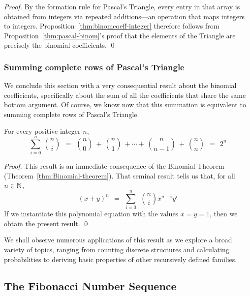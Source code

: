 \begin{proof}
By the formation rule for Pascal's Triangle, every entry in that array is obtained from integers via repeated additions---an operation that maps integers to integers. Proposition~\ref{thm:binomcoeff-integer} therefore follows from Proposition~\ref{thm:pascal-binom}'s proof that the elements of the Triangle are precisely the binomial coefficients.  \qed
\end{proof}


\subsubsection{Summing complete rows of Pascal's Triangle}
\label{sec:summaion-BinCoeff}

We conclude this section with a very consequential result about the binomial coefficients, specifically about the sum of all the coefficients that share the same bottom argument.  Of course, we know now that this summation is equivalent to summing complete rows of Pascal's Triangle.


\begin{prop}
\label{thm:sumsof-binomcoeff}
For every positive integer $n$,
\[
\sum_{i=0}^n \ {n \choose i} \ \ = \ \
{n \choose 0} \ + \ {n \choose 1} \ + \cdots + \ {n \choose {n-1}} \ + \ {n \choose n} \ \ = \ \ 2^n
\]
\end{prop}

\begin{proof}
This result is an immediate consequence of the Binomial Theorem 
(Theorem~\ref{thm:Binomial-theorem}).  That seminal result tells us that, for all $n \in \mathbb{N}$,
\[
(x+y)^n \ \ = \ \ \sum_{i=0}^n \ \ {n \choose i} x^{n-i} y^i
\]
If we instantiate this polynomial equation with the values $x = y = 1$, then we obtain the present result.  \qed
\end{proof}

\smallskip

We shall observe numerous applications of this result as we explore a broad variety of topics, ranging from counting discrete structures and calculating probabilities to deriving basic properties of other recursively defined families.

\subsection{The Fibonacci Number Sequence}
\label{sec:Fibonacci}

